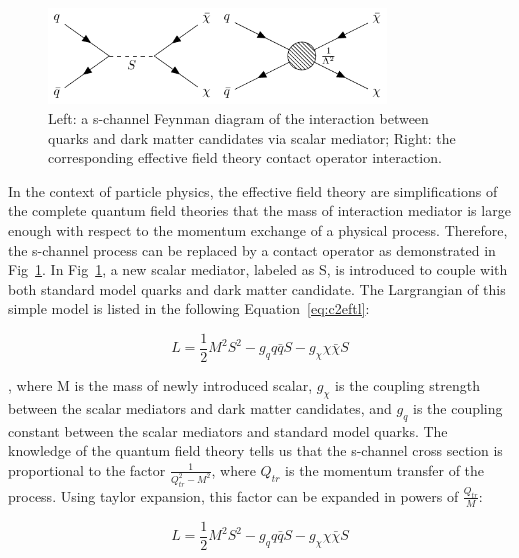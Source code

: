 \begin{figure}[htbp]
  \begin{center}
    \includegraphics[width=0.8\textwidth]{chapters/c2/figures/eft-feyn-diagram}
  \end{center}
  \caption{Left: a s-channel Feynman diagram of the interaction between quarks and dark matter candidates via scalar mediator; Right: the corresponding effective field theory contact operator interaction.}
  \label{fig:c2eftfeyndiagram}
\end{figure}

In the context of particle physics, the effective field theory are simplifications of the complete quantum field theories that the mass of interaction mediator is large enough with respect to the momentum exchange of a physical process. Therefore, the s-channel process can be replaced by a contact operator as demonstrated in Fig~\ref{fig:c2eftfeyndiagram}. In Fig~\ref{fig:c2eftfeyndiagram}, a new scalar mediator, labeled as S, is introduced to couple with both standard model quarks and dark matter candidate. The Largrangian of this simple model is listed in the following Equation~\ref{eq:c2eftl}:

\begin{equation}
  L = \frac{1}{2}M^{2}S^{2}-g_{q}q\bar{q}S-g_{\chi}\chi\bar{\chi}S
  \label{eq:c2eftl}
\end{equation}

, where M is the mass of newly introduced scalar, $g_{\chi}$ is the coupling strength between the scalar mediators and dark matter candidates, and $g_{q}$ is the coupling constant between the scalar mediators and standard model quarks. The knowledge of the quantum field theory tells us that the s-channel cross section is proportional to the factor $\frac{1}{Q_{tr}^{2}-M^{2}}$, where $Q_{tr}$ is the momentum transfer of the process. Using taylor expansion, this factor can be expanded in powers of $\frac{Q_{tr}}{M}$: 

\begin{equation}
  L = \frac{1}{2}M^{2}S^{2}-g_{q}q\bar{q}S-g_{\chi}\chi\bar{\chi}S
  \label{eq:c2taylorexp}
\end{equation}

